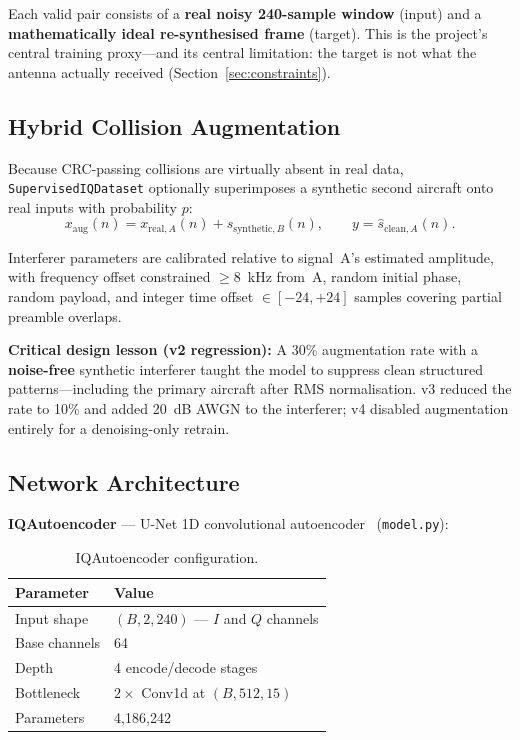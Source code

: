 \documentclass[11pt,a4paper]{article}
\begin{document}
Each valid pair consists of a \textbf{real noisy 240-sample window} (input) and
a \textbf{mathematically ideal re-synthesised frame} (target). This is the
project's central training proxy---and its central limitation: the target is
not what the antenna actually received (Section~\ref{sec:constraints}).

\subsection{Hybrid Collision Augmentation}

Because CRC-passing collisions are virtually absent in real data,
\texttt{SupervisedIQDataset} optionally superimposes a synthetic second
aircraft onto real inputs with probability $p$:
\begin{equation}
  x_{\mathrm{aug}}(n) = x_{\mathrm{real},A}(n) + s_{\mathrm{synthetic},B}(n),
  \qquad y = \hat{s}_{\mathrm{clean},A}(n).
  \label{eq:augment}
\end{equation}

Interferer parameters are calibrated relative to signal~A's estimated amplitude,
with frequency offset constrained $\geq 8$~kHz from~A, random initial phase,
random payload, and integer time offset $\in [-24, +24]$ samples covering
partial preamble overlaps.

\textbf{Critical design lesson (v2 regression):} A 30\% augmentation rate with
a \textbf{noise-free} synthetic interferer taught the model to suppress clean
structured patterns---including the primary aircraft after RMS normalisation.
v3 reduced the rate to 10\% and added 20~dB AWGN to the interferer; v4 disabled
augmentation entirely for a denoising-only retrain.

\subsection{Network Architecture}

\textbf{IQAutoencoder} --- U-Net 1D convolutional autoencoder~\cite{ronneberger2015unet}
(\texttt{model.py}):

\begin{table}[htbp]
  \centering
  \caption{IQAutoencoder configuration.}
  \label{tab:architecture}
  \begin{tabular}{@{}ll@{}}
    \toprule
    Parameter & Value \\
    \midrule
    Input shape & $(B, 2, 240)$ --- $I$ and $Q$ channels \\
    Base channels & 64 \\
    Depth & 4 encode/decode stages \\
    Bottleneck & $2\times$ Conv1d at $(B, 512, 15)$ \\
    Parameters & 4{,}186{,}242 \\
    \bottomrule
  \end{tabular}
\end{table}
\end{document}
